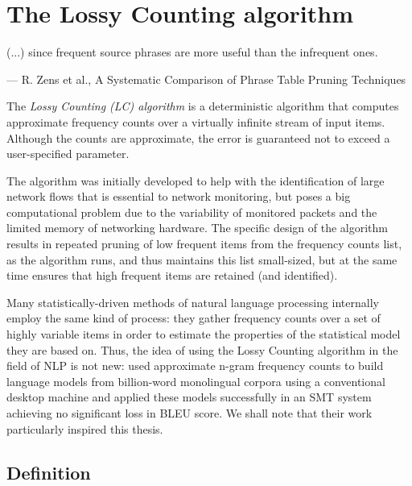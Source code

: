 \chapter{The Lossy Counting algorithm}
\label{chap:lossy-counting}

\setlength{\epigraphwidth}{1.0\textwidth}
\epigraph{(...) since frequent source phrases are more useful than the infrequent ones.}{--- R. Zens et al., A Systematic Comparison of Phrase Table Pruning Techniques}

The \emph{Lossy Counting (LC) algorithm} \citep{manku:lossycounting} is
a deterministic algorithm that computes approximate frequency counts
over a virtually infinite stream of input items.
Although the counts are approximate, the error is guaranteed not to exceed
a user-specified parameter.

The algorithm was initially developed to help with the identification of
large network flows that is essential to network monitoring, but poses a big
computational problem due to the variability of monitored packets and the limited
memory of networking hardware.
The specific design of the algorithm results in repeated pruning of low frequent
items from the frequency counts list, as the algorithm runs, and thus maintains
this list small-sized, but at the same time ensures that high frequent items are
retained (and identified).

Many statistically-driven methods of natural language processing internally
employ the same kind of process: they gather frequency counts over a set of highly
variable items in order to estimate the properties of the statistical model they are
based on.
Thus, the idea of using the Lossy Counting algorithm in the field of NLP is not new:
\citet{goyal:streaminglm} used approximate n-gram frequency counts to build language
models from billion-word monolingual corpora using a conventional desktop machine and
applied these models successfully in an SMT system achieving no significant loss in BLEU
score. We shall note that their work particularly inspired this thesis.

\section{Definition}
\label{sec:lossy-counting-definition}

